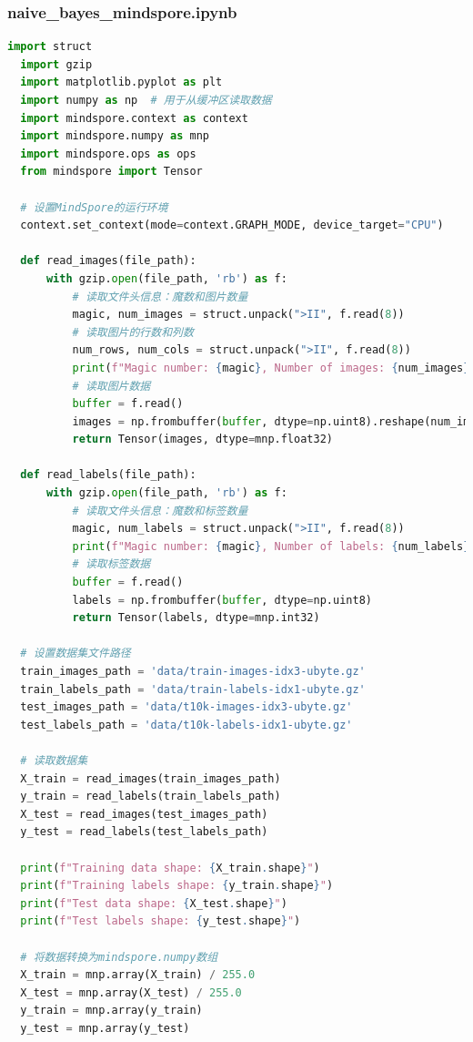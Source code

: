 \documentclass[12pt]{article}
\begin{document}
\subsubsection{naive\_bayes\_mindspore.ipynb}
\begin{lstlisting}[language=Python]
  import struct
  import gzip
  import matplotlib.pyplot as plt
  import numpy as np  # 用于从缓冲区读取数据
  import mindspore.context as context
  import mindspore.numpy as mnp
  import mindspore.ops as ops
  from mindspore import Tensor
  
  # 设置MindSpore的运行环境
  context.set_context(mode=context.GRAPH_MODE, device_target="CPU")
  
  def read_images(file_path):
      with gzip.open(file_path, 'rb') as f:
          # 读取文件头信息：魔数和图片数量
          magic, num_images = struct.unpack(">II", f.read(8))
          # 读取图片的行数和列数
          num_rows, num_cols = struct.unpack(">II", f.read(8))
          print(f"Magic number: {magic}, Number of images: {num_images}, Rows: {num_rows}, Columns: {num_cols}")
          # 读取图片数据
          buffer = f.read()
          images = np.frombuffer(buffer, dtype=np.uint8).reshape(num_images, num_rows, num_cols)
          return Tensor(images, dtype=mnp.float32)
  
  def read_labels(file_path):
      with gzip.open(file_path, 'rb') as f:
          # 读取文件头信息：魔数和标签数量
          magic, num_labels = struct.unpack(">II", f.read(8))
          print(f"Magic number: {magic}, Number of labels: {num_labels}")
          # 读取标签数据
          buffer = f.read()
          labels = np.frombuffer(buffer, dtype=np.uint8)
          return Tensor(labels, dtype=mnp.int32)
  
  # 设置数据集文件路径
  train_images_path = 'data/train-images-idx3-ubyte.gz'
  train_labels_path = 'data/train-labels-idx1-ubyte.gz'
  test_images_path = 'data/t10k-images-idx3-ubyte.gz'
  test_labels_path = 'data/t10k-labels-idx1-ubyte.gz'
  
  # 读取数据集
  X_train = read_images(train_images_path)
  y_train = read_labels(train_labels_path)
  X_test = read_images(test_images_path)
  y_test = read_labels(test_labels_path)
  
  print(f"Training data shape: {X_train.shape}")
  print(f"Training labels shape: {y_train.shape}")
  print(f"Test data shape: {X_test.shape}")
  print(f"Test labels shape: {y_test.shape}")
  
  # 将数据转换为mindspore.numpy数组
  X_train = mnp.array(X_train) / 255.0
  X_test = mnp.array(X_test) / 255.0
  y_train = mnp.array(y_train)
  y_test = mnp.array(y_test)
  

\end{lstlisting}
\end{document}

